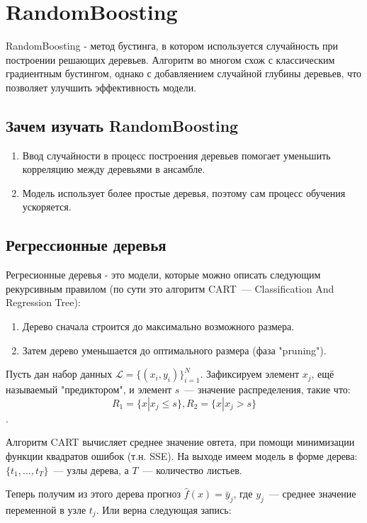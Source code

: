 \section*{RandomBoosting}

RandomBoosting - метод бустинга, в котором используется случайность при построении решающих деревьев. Алгоритм во многом схож с классическим градиентным бустингом, однако с добавляением случайной глубины деревьев, что позволяет улучшить эффективность модели.

\subsection*{Зачем изучать RandomBoosting}
\begin{enumerate}
    \item {} Ввод случайности в процесс построения деревьев помогает уменьшить корреляцию между деревьями в ансамбле.
    \item {} Модель использует более простые деревья, поэтому сам процесс обучения ускоряется. 
\end{enumerate}

\subsection*{Регрессионные деревья}
 Регресионные деревья - это модели, которые можно описать следующим рекурсивным правилом (по сути это алгоритм CART~--- Classification And Regression Tree):
\begin{enumerate}
    \item Дерево сначала строится до максимально возможного размера.
    \item Затем дерево уменьшается до оптимального размера (фаза "pruning").
\end{enumerate}

Пусть дан набор данных $\mathcal{L} = \{(x_i, y_i)\}_{i = 1}^N$. Зафиксируем элемент $x_j$, ещё называемый "предиктором", и элемент $s$~--- значение распределения, такие что:
$$R_1 = \{x | x_j \leq s\}, R_2=\{x | x_j > s\}$$.

Алгоритм CART вычисляет среднее значение овтета, при помощи минимизации функции квадратов ошибок (т.н. SSE). На выходе имеем модель в форме дерева: $\{t_1, ...,t_T\}$~--- узлы дерева, а $T$~--- количество листьев. 

Теперь получим из этого дерева прогноз $\hat{f}(x)=\bar{y}_j$, где $y_j$~--- среднее значение переменной в узле $t_j$. Или верна следующая запись:

